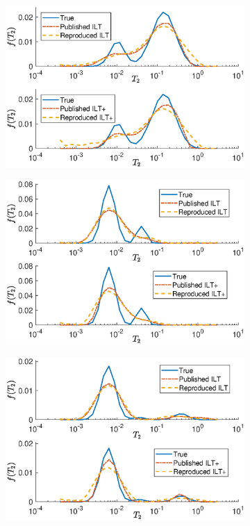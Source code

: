 \begin{figure}[htb!]
    \centering
    \begin{subfigure}[b]{0.49\textwidth}
        \includegraphics[width=\textwidth]{evaluation/model1_recreate.eps}
        \label{fig:model1Recreation}
    \end{subfigure}
    \begin{subfigure}[b]{0.49\textwidth}
        \includegraphics[width=\textwidth]{evaluation/model2_recreate.eps}
        \label{fig:model2Recreation}
    \end{subfigure}
    \begin{subfigure}[b]{0.49\textwidth}
        \includegraphics[width=\textwidth]{evaluation/model3_recreate.eps}

\end{subfigure}
\end{figure}
